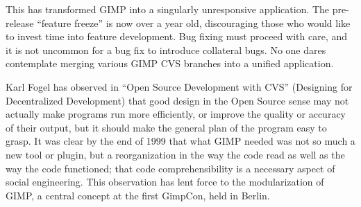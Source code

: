 This has transformed GIMP into a singularly unresponsive application.
The pre-release ``feature freeze'' is now over a year old, discouraging
those who would like to invest time into feature development.
 Bug fixing must proceed with care, and it is not uncommon for a bug fix 
to introduce collateral bugs. No one dares contemplate merging various
GIMP CVS branches into a unified application. 

Karl Fogel has observed in ``Open Source Development with CVS''
(Designing for Decentralized Development) that good design in the Open
Source sense may not actually make programs run more efficiently, or
improve the quality or accuracy of their output, but it should make
the general plan of the program easy to grasp.  It was clear by the
end of 1999 that what GIMP needed was not so much a new tool or
plugin, but a reorganization in the way the code read as well as the
way the code functioned; that code comprehensibility is a necessary
aspect of social engineering. This observation has lent force to
the modularization of GIMP, a central concept at the first GimpCon,
held in Berlin.

